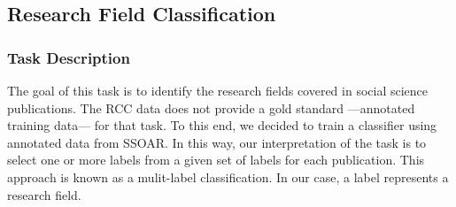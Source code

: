 
\subsection{Research Field Classification}
\label{section:field_classification}
\subsubsection{Task Description}
The goal of this task is to identify the research fields covered in social science publications.
The RCC data does not provide a gold standard ---annotated training data--- for that task. To this end, we decided to train a classifier using annotated data from SSOAR.
In this way, our interpretation of the task is to select one or more labels from a given set of labels for each publication. This approach is known as a mulit-label classification. In our case, a label represents a research field.

